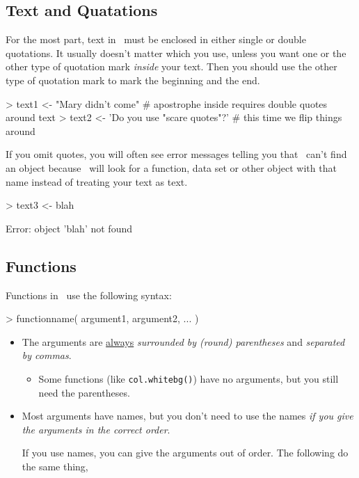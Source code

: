 \subsection{Text and Quatations}

For the most part, text in \R\ must be enclosed in either single or double quotations.  
It usually doesn't matter which you use, unless you want one or the other type of 
quotation mark \emph{inside} your text.  Then you should use the other type of 
quotation mark to mark the beginning and the end.

\begin{Schunk}
\begin{Sinput}
> text1 <- "Mary didn't come"            # apostrophe inside requires double quotes around text
> text2 <- 'Do you use "scare quotes"?'  # this time we flip things around
\end{Sinput}
\end{Schunk}

If you omit quotes, you will often see error messages telling you that \R\ can't find 
an object because \R\
will look for a function, data set or other object with that name instead of treating
your text as text.
\begin{Schunk}
\begin{Sinput}
> text3 <- blah
\end{Sinput}
\begin{Soutput}
Error: object 'blah' not found
\end{Soutput}
\end{Schunk}

\subsection{Functions}

Functions in \R\ use the following syntax:

\begin{Schunk}
\begin{Sinput}
> functionname( argument1, argument2, ... )
\end{Sinput}
\end{Schunk}
\vspace{-5mm}
\begin{itemize}
\item The arguments are \underline{always} \emph{surrounded by (round) parentheses} and 
\emph{separated by commas}.
\begin{itemize}
\item
Some functions (like \verb!col.whitebg()!) 
have no arguments, but you still need the parentheses.
\end{itemize}
\item
Most arguments have names, but you don't need to use the names \emph{if you 
give the arguments in the correct order}.  

If you use names, you can give the arguments out of order.  
The following do the same thing,
\end{itemize}

